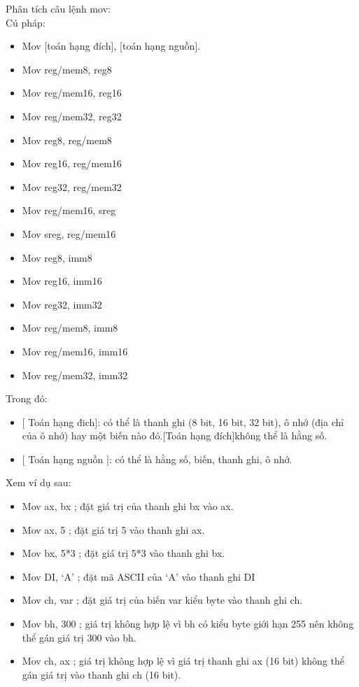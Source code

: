 		Phân tích câu lệnh mov: \\
		Cú pháp: 
		\begin{itemize}
			\renewcommand{\labelitemi}{\textbullet}	
			\item Mov [toán hạng đích], [toán hạng nguồn].
			\item	Mov reg/mem8, reg8
			\item Mov reg/mem16, reg16
			\item	Mov reg/mem32, reg32
			\item	Mov reg8, reg/mem8
			\item	Mov reg16, reg/mem16
			\item	Mov reg32, reg/mem32
			\item	Mov reg/mem16, sreg
			\item	Mov sreg, reg/mem16
			\item	Mov reg8, imm8
			\item	Mov reg16, imm16
			\item	Mov reg32, imm32
			\item	Mov reg/mem8, imm8
			\item	Mov reg/mem16, imm16
			\item	Mov reg/mem32, imm32	
		\end{itemize}
	
	Trong đó: 
	\begin{itemize}
		\renewcommand{\labelitemi}{\textbullet}	
			\item  $[$ Toán hạng đich$]$: có thể là thanh ghi (8 bit, 16 bit, 32 bit), ô nhớ (địa chỉ của ô nhớ) hay một biến nào đó.$[$Toán hạng đích$]$không thể là hằng số.
			\item $[$ Toán hạng nguồn $]$: có thể là hằng số, biến, thanh ghi, ô nhớ.
	\end{itemize}

	Xem ví dụ sau:
		\begin{itemize}
		\renewcommand{\labelitemi}{\textbullet}	
		\item	Mov ax, bx 		; đặt giá trị của thanh ghi bx vào ax.
		\item Mov ax, 5		; đặt giá trị 5 vào thanh ghi ax.
		\item	Mov bx, 5*3 		; đặt giá trị 5*3 vào thanh ghi bx.
		\item Mov DI, ‘A’		; đặt mã ASCII của ‘A’ vào thanh ghi DI
		\item Mov ch, var		; đặt giá trị của biến var kiểu byte vào thanh ghi ch.
		\item	Mov bh, 300		; giá trị không hợp lệ vì bh có kiểu byte giới hạn 255 nên không thể gán giá trị 300 vào bh.
		\item	Mov ch, ax		; giá trị không hợp lệ vì giá trị thanh ghi ax (16 bit) không thể gán giá trị vào thanh ghi ch (16 bit).  
		\end{itemize}

